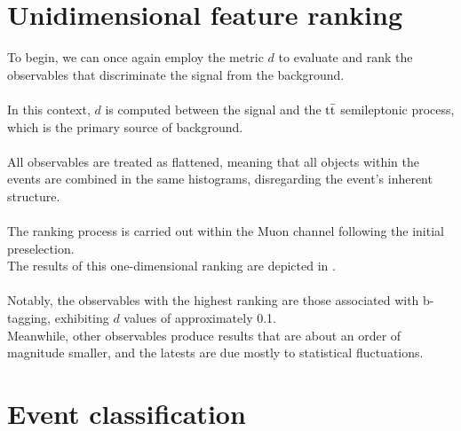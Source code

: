 \begin{minipage}[H]{\linewidth}
\begin{minipage}{0.62\linewidth}
\section{Unidimensional feature ranking}
To begin,  we can once again employ the metric $d$ to evaluate and rank the observables that discriminate the signal from the background.\\
\\
In this context, $d$ is computed between the signal and the ${{\text{t}}{\bar{\text{t}}}}$ semileptonic process, which is the primary source of background.\\
\\
All observables are treated as flattened, meaning that all objects within the events are combined in the same histograms, disregarding the event's inherent structure.\\
\\
The ranking process is carried out within the Muon channel following the initial preselection.\\
The results of this one-dimensional ranking are depicted in .\\
\\
Notably, the observables with the highest ranking are those associated with b-tagging, exhibiting $d$ values of approximately 0.1.\\
Meanwhile, other observables produce results that are about an order of magnitude smaller, and the latests are due mostly to statistical fluctuations.

\end{minipage}
        \label{fig:1Drank}  
\end{minipage}
\section{Event classification}
